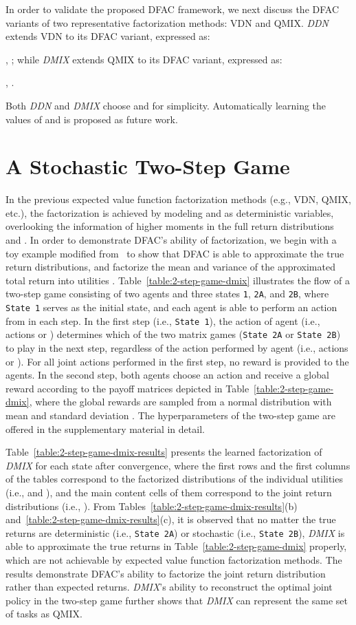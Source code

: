 \documentclass{article}
\newcommand{\ddn}{\textit{DDN}}
\newcommand{\dmix}{\textit{DMIX}}
\newcounter{example}
\begin{document}
In order to validate the proposed DFAC framework, we next discuss the DFAC variants of two representative factorization methods: VDN and QMIX. \ddn{} extends VDN to its DFAC variant, expressed as:

, ; while \dmix{} extends QMIX to its DFAC variant, expressed as:

, .

Both \ddn{} and \dmix{} choose  and  for simplicity. Automatically learning the values of  and  is proposed as future work. \section{A Stochastic Two-Step Game}
\label{sec:distributional_2_step_game}

In the previous expected value function factorization methods (e.g., VDN, QMIX, etc.), the factorization is achieved by modeling  and  as deterministic variables, overlooking the information of higher moments in the full return distributions  and .
In order to demonstrate DFAC's ability of factorization, we begin with a toy example modified from~\cite{Rashid2018QMIX} to show that DFAC is able to approximate the true return distributions, and factorize the mean and variance of the approximated total return  into utilities .
Table~\ref{table:2-step-game-dmix} illustrates the flow of a two-step game consisting of two agents and three states \texttt{1}, \texttt{2A}, and \texttt{2B}, where \texttt{State~1} serves as the initial state, and each agent is able to perform an action from  in each step. In the first step (i.e., \texttt{State 1}), the action of agent  (i.e., actions  or ) determines which of the two matrix games (\texttt{State 2A} or \texttt{State 2B}) to play in the next step, regardless of the action performed by agent  (i.e., actions  or ). For all joint actions performed in the first step, no reward is provided to the agents.
In the second step, both agents choose an action and receive a global reward according to the payoff matrices depicted in Table~\ref{table:2-step-game-dmix}, where the global rewards are sampled from a normal distribution  with mean  and standard deviation . The hyperparameters of the two-step game are offered in the supplementary material in detail.

Table~\ref{table:2-step-game-dmix-results} presents the learned factorization of \dmix{} for each state after convergence, where the first rows and the first columns of the tables correspond to the factorized distributions of the individual utilities (i.e.,  and ), and the main content cells of them correspond to the joint return distributions (i.e., ). 
From Tables~\ref{table:2-step-game-dmix-results}(b) and~\ref{table:2-step-game-dmix-results}(c), it is observed that no matter the true returns are deterministic (i.e., \texttt{State 2A}) or stochastic (i.e., \texttt{State 2B}), \dmix{} is able to approximate the true returns in Table~\ref{table:2-step-game-dmix} properly, which are not achievable by expected value function factorization methods. The results demonstrate DFAC's ability to factorize the joint return distribution rather than expected returns. \dmix{}'s ability to reconstruct the optimal joint policy in the two-step game further shows that \dmix{} can represent the same set of tasks as QMIX.
\end{document}
